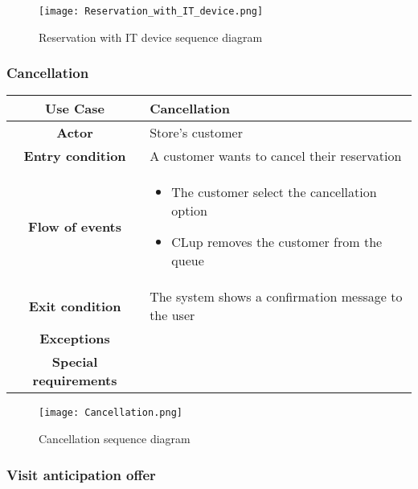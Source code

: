 \documentclass[../../main.tex]{subfiles}
\begin{document}
      \begin{figure}[H]
        \centering
        \texttt{[image: Reservation\_with\_IT\_device.png]}
        \caption{Reservation with IT device sequence diagram}
      \end{figure}


      \subsubsection{Cancellation}

      \begin{table}[H]
        \centering
          \begin{tabular}{c m{}}
          \hline
          \textbf{Use Case} & Cancellation\\ \hline
          \textbf{Actor} & Store's customer\\ \hline
          \textbf{Entry condition} & A customer wants to cancel their reservation\\  \hline
          \textbf{Flow of events} & \begin{itemize}
                                      \item The customer select the cancellation option
                                      \item CLup removes the customer from the queue
                                    \end{itemize}\\ \hline
          \textbf{Exit condition} & The system shows a confirmation message to the user \\ \hline
          \textbf{Exceptions} &\\ \hline
          \textbf{Special requirements} &\\ \hline
          \end{tabular}
      \end{table}

      \begin{figure}[H]
        \centering
        \texttt{[image: Cancellation.png]}
        \caption{Cancellation sequence diagram}
      \end{figure}

      
      \subsubsection{Visit anticipation offer}
\end{document}
